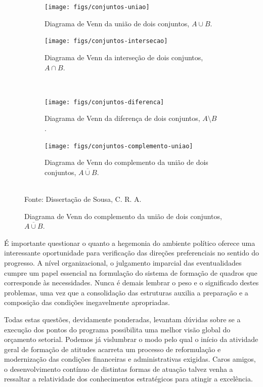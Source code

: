 \documentclass[fleqn]{icat-ufal}
\begin{document}
\begin{figure}
    \centering
    \caption{Exemplo de uma figura com sub-figuras.}
    \label{fig:equilibrium}
    \begin{subfigure}[t]{0.4\linewidth}
        \centering
        \caption{Diagrama de Venn da união de dois conjuntos, $A\cup B$.}
        \label{fig:conjuntos_uniao}
            \texttt{[image: figs/conjuntos-uniao]}
    \end{subfigure}%
    \hspace{1cm}
    \begin{subfigure}[t]{0.4\linewidth}
        \centering
        \caption{Diagrama de Venn da interseção de dois conjuntos, $A\cap B$.}
        \label{fig:conjuntos_intersecao}
            \texttt{[image: figs/conjuntos-intersecao]}
    \end{subfigure}%
    \\[3mm]
    \begin{subfigure}[t]{0.4\linewidth}
        \centering
        \caption{Diagrama de Venn da diferença de dois conjuntos, $A\setminus B$.}
        \label{fig:conjuntos_diferenca}
            \texttt{[image: figs/conjuntos-diferenca]}
    \end{subfigure}%
    \hspace{1cm}
    \begin{subfigure}[t]{0.4\linewidth}
        \centering
        \caption{Diagrama de Venn do complemento da união de dois conjuntos, $\overline{A\cup B}$.}
        \label{fig:conjuntos_complemento_uniao}
            \texttt{[image: figs/conjuntos-complemento-uniao]}
    \end{subfigure}
    \\[2mm] Fonte: Dissertação de Sousa, C. R. A. \cite{SOUZA:Bayesiana}
\end{figure}

É importante questionar o quanto a hegemonia do ambiente político oferece uma
interessante oportunidade para verificação das direções preferenciais no sentido
do progresso. A nível organizacional, o julgamento imparcial das eventualidades
cumpre um papel essencial na formulação do sistema de formação de quadros que
corresponde às necessidades. Nunca é demais lembrar o peso e o significado
destes problemas, uma vez que a consolidação das estruturas auxilia a preparação
e a composição das condições inegavelmente apropriadas. 

Todas estas questões, devidamente ponderadas, levantam dúvidas sobre se a
execução dos pontos do programa possibilita uma melhor visão global do orçamento
setorial. Podemos já vislumbrar o modo pelo qual o início da atividade geral de
formação de atitudes acarreta um processo de reformulação e modernização das
condições financeiras e administrativas exigidas. Caros amigos, o
desenvolvimento contínuo de distintas formas de atuação talvez venha a ressaltar
a relatividade dos conhecimentos estratégicos para atingir a excelência. 
\end{document}
